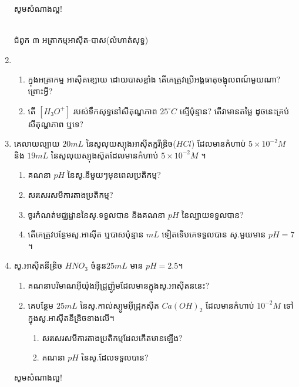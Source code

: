 \documentclass[12pt, a4paper]{article}
\begin{document}
\begin{enumerate}[m]
\begin{center}
	\sffamily\color{black}
	សូមសំណាងល្អ!
\end{center}
	\newpage
	\begin{center}
		\sffamily\color{black}
		\\
		ជំពូក ៣ អត្រាកម្មអាស៊ីត-បាស(លំហាត់សុទ្ធ)
	\end{center}
	\item \begin{enumerate}[k]
		\item ក្នុងអត្រាកម្ម អាស៊ីតខ្សោយ ដោយបាសខ្លាំង តើគេត្រូវប្រើអង្គធាតុចង្អុលពណ៍មួយណា? ព្រោះអ្វី?
		\item តើ $[H_3O^+]$ របស់ទឹកសុទ្ធនៅសីតុណ្ហភាព $25^\circ C$ ស្មើប៉ុន្មាន? តើវាមានតម្លៃ ដូចនេះគ្រប់សីតុណ្ហភាព ឬទេ?
	\end{enumerate}
	\item គេលាយល្បាយ $20mL$ នៃសូលុយស្យុងអាស៊ីតក្លរីឌ្រិច($HCl$) ដែលមានកំហាប់ $5\times10^{-2}M$ និង $19mL$ នៃសូលុយស្យុងស៊ូតដែលមានកំហាប់ $5\times10^{-2}M$ ។
	\begin{enumerate}[k]
		\item គណនា $pH$ នៃសូ.នីមួយៗមុនពេលប្រតិកម្ម?
		\item សរសេរសមីការតាងប្រតិកម្ម?
		\item ចូរកំណត់មជ្ឈដ្ឋាននៃសូ.ទទួលបាន និងគណនា $pH$ នៃល្បាយទទួលបាន?
		\item តើគេត្រូវបន្ថែមសូ.អាស៊ីត ឬបាសប៉ុន្មាន $mL$ ទៀតទើបគេទទួលបាន សូ.មួយមាន $pH=7$ ។
	\end{enumerate}
	\item សូ.អាស៊ីតនីឌ្រិច $HNO_3$ ចំនួន$25mL$ មាន $pH=2.5$។
	\begin{enumerate}[k]
		\item គណនាបរិមាណអ៊ីយ៉ុងអ៊ីដ្រូញ៉ូមដែលមានក្នុងសូ.អាស៊ីតននេះ?
		\item គេបន្ថែម $25mL$ នៃសូ.កាល់ស្យូមអ៊ីដ្រុកស៊ីត $Ca(OH)_2$ ដែលមានកំហាប់ $10^{-2}M$ ទៅក្នុងសូ.អាស៊ីតនីឌ្រិចខាងលើ។
		\begin{enumerate}[1]
			\item សរសេរសមីការតាងប្រតិកម្មដែលកើតមានឡើង?
			\item គណនា $pH$ នៃសូ.ដែលទទួលបាន?
		\end{enumerate}
	\end{enumerate}
	\begin{center}
		\sffamily\color{black}
		សូមសំណាងល្អ!
	\end{center}\newpage
	\begin{center}
		\sffamily\color{black}
		\\

\end{center}
\end{enumerate}
\end{document}
